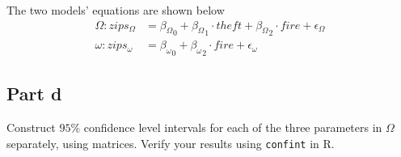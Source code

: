 \begin{answer}
   The two models' equations are shown below
    \begin{equation}
        \begin{aligned}
            \Omega: zips_{\Omega} & = {{\beta}_{\Omega}}_0 + {{\beta}_{\Omega}}_1 \cdot theft + {{\beta}_{\Omega}}_2 \cdot fire + \epsilon_{\Omega}\\
            \omega: zips_{\omega} & = {{\beta}_{\omega}}_0 + {{\beta}_{\omega}}_2 \cdot fire + \epsilon_{\omega}
        \end{aligned}
    \end{equation}
\end{answer}

\subsection{Part d}

\begin{question}
    Construct $95\%$ confidence level intervals for each of the three parameters in $\Omega$ separately, using matrices. Verify your results using \verb+confint+ in R.
\end{question}

